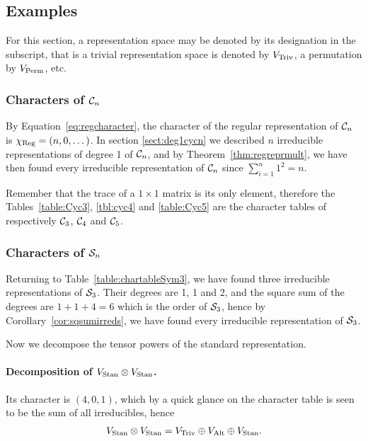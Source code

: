 {\allowdisplaybreaks\subsection{Examples}


\begin{notation}
	For this section, a representation space may be denoted by its designation in the subscript, that is a trivial representation space is denoted 
	by $V_{\text{Triv}}$, a permutation by $V_{\text{Perm}}$, etc.
\end{notation}

\subsubsection{Characters of $\mathcal{C}_n$}

\begin{example}
	By Equation~\ref{eq:regcharacter}, the character of the regular representation of $\mathcal{C}_n$ is $\chi_{\text{Reg}} = (n, 0, \dots)$. In section \ref{sect:deg1cycn} we described $n$ irreducible representations of degree 1 of  $\mathcal{C}_n$, and by Theorem~\ref{thm:regreprmult}, we have then found every irreducible representation of $\mathcal{C}_n$ since $\sum_{i=1}^n 1^2 = n$.
	
	Remember that the trace of a $1 \times 1$ matrix is its only element, therefore the Tables~\ref{table:Cyc3}, \ref{tbl:cyc4} and \ref{table:Cyc5} are the character tables of respectively $\mathcal{C}_3$, $\mathcal{C}_4$ and $\mathcal{C}_5$.
\end{example}

\subsubsection{Characters of $\mathcal{S}_n$}
	
\begin{example}
	Returning to Table~\ref{table:chartableSym3}, we have found three irreducible representations of $\mathcal{S}_3$. Their degrees are 1, 1 and 2, and the square sum of the degrees are $1 + 1 + 4 = 6$ which is the order of $\mathcal{S}_3$, hence by Corollary~\ref{cor:sqsumirreds}, we have found every irreducible representation of $\mathcal{S}_3$. 
	
	Now we decompose the tensor powers of the standard representation.
	
	\paragraph{Decomposition of $V_{\text{Stan}} \otimes V_{\text{Stan}}$.} Its character is $(4,0,1)$, which by a quick glance on the character table is seen to be the sum of all irreducibles, hence \begin{align*}
		V_{\text{Stan}} \otimes V_{\text{Stan}} = V_{\text{Triv}} \oplus V_{\text{Alt}} \oplus V_{\text{Stan}}.
	\end{align*}
	

\end{example}}
